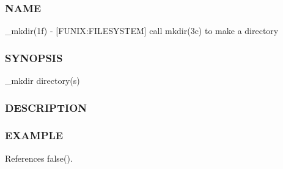\subsubsection*{N\+A\+ME}

\+\_\+mkdir(1f) -\/ \mbox{[}F\+U\+N\+IX\+:F\+I\+L\+E\+S\+Y\+S\+T\+EM\mbox{]} call mkdir(3c) to make a directory \subsubsection*{S\+Y\+N\+O\+P\+S\+IS}

\+\_\+mkdir directory(s) \subsubsection*{D\+E\+S\+C\+R\+I\+P\+T\+I\+ON}

\subsubsection*{E\+X\+A\+M\+P\+LE}

References false().

